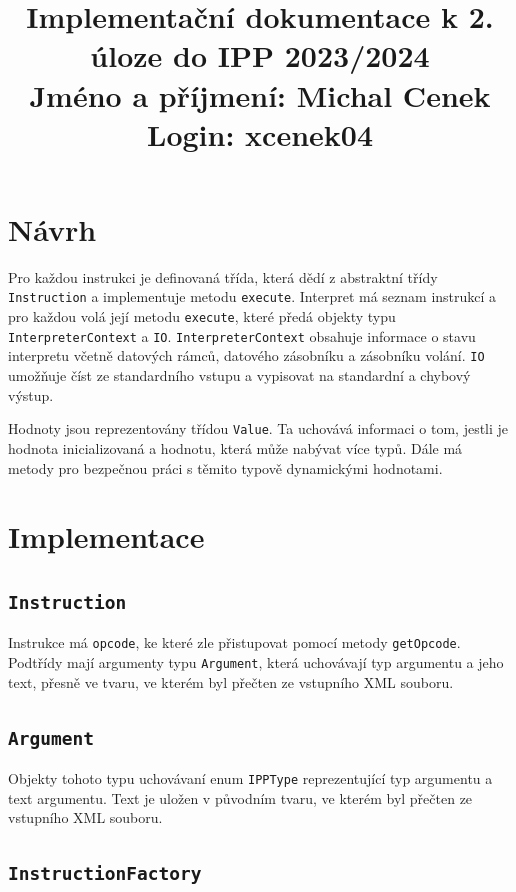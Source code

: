 \documentclass[11pt, letterpaper]{article}
\title{
    Implementační dokumentace k 2. úloze do IPP 2023/2024 \\
    Jméno a příjmení: Michal Cenek \\
    Login: xcenek04
}
\date{}
\begin{document}
\maketitle

\section{Návrh}

Pro každou instrukci je definovaná třída, která dědí z abstraktní třídy \texttt{Instruction} a implementuje metodu \texttt{execute}. Interpret má seznam instrukcí a pro každou volá její metodu \texttt{execute}, které předá objekty typu \texttt{InterpreterContext} a \texttt{IO}. \texttt{InterpreterContext} obsahuje informace o stavu interpretu včetně datových rámců, datového zásobníku a zásobníku volání. \texttt{IO} umožňuje číst ze standardního vstupu a vypisovat na standardní a chybový výstup.

Hodnoty jsou reprezentovány třídou \texttt{Value}. Ta uchovává informaci o tom, jestli je hodnota inicializovaná a hodnotu, která může nabývat více typů. Dále má metody pro bezpečnou práci s těmito typově dynamickými hodnotami.

\section{Implementace}

\subsection{\texttt{Instruction}}

Instrukce má \texttt{opcode}, ke které zle přistupovat pomocí metody \texttt{getOpcode}. Podtřídy mají argumenty typu \texttt{Argument}, která uchovávají typ argumentu a jeho text, přesně ve tvaru, ve kterém byl přečten ze vstupního XML souboru.

\subsection{\texttt{Argument}}

Objekty tohoto typu uchovávaní enum \texttt{IPPType} reprezentující typ argumentu a text argumentu. Text je uložen v původním tvaru, ve kterém byl přečten ze vstupního XML souboru.

\subsection{\texttt{InstructionFactory}}
\end{document}
